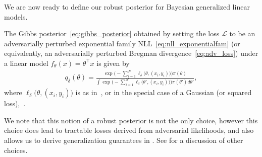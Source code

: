 \iffalse
\begin{lemma}[Equivalence between adversarial loss and adversarial training] 
The point estimate obtained by optimizing $\arg\min_{\theta}  {\ell}_\delta(\theta, \mathcal{D})$ is equivalent to performing adversarial training with objective $\arg \min_{\theta} \sum_{i=1}^n \max_{\| \widetilde{x}_i -x_i\|_2 \leq \delta} \lp  \widetilde{x}_i^\top \theta - y_i \rp^2$.
\label{lm:adv_loss_adv_training}
\end{lemma}
\fi


\iffalse
\begin{lemma}[Equivalence between adversarial loss and adversarial training] 
The point estimate obtained by optimizing $\arg\min_{\theta}  {\ell}_\delta(\theta, \mathcal{D})$ is equivalent to performing adversarial training with objective $\arg \min_{\theta} \sum_{i=1}^n \max_{\| \widetilde{x}_i -x_i\|_2 \leq \delta} \lp  \widetilde{x}_i^\top \theta - y_i \rp^2$.
\label{lm:adv_loss_adv_training}
\end{lemma}
\fi

We are now ready to define our robust posterior for Bayesian generalized linear models.
\begin{corollary}    \label{cor:robust_posterior}
    The Gibbs posterior~\eqref{eq:gibbs_posterior} obtained by setting the loss $\mathcal{L}$ to be an adversarially perturbed exponential family NLL~\eqref{eq:nll_exponentialfam} (or equivalently, an adversarially perturbed Bregman divergence~\eqref{eq:adv_loss}) under a linear model $f_\theta(x) = \theta^\top x$ is given by
    \begin{align*}
        q_\delta(\theta) = \frac{\exp\Big( -\sum_{i=1}^N\ell_\delta\big( \theta, (x_i, y_i)\big) \Big) \pi(\theta) }{\int \exp\Big( - \sum_{i=1}^N\ell_\delta\big( \theta', (x_i, y_i)\big) \Big) \pi(\theta') d\theta'},
    \end{align*}
    where $\ell_\delta\big( \theta, (x_i, y_i)\big) $ is as in~, or in the special case of a Gaussian (or squared loss),~.
\end{corollary}
We note that this notion of a robust posterior is not the only choice, however this choice does lead to tractable losses derived from adversarial likelihoods, and also allows us to derive generalization guarantees in .
See  for a discussion of other choices.